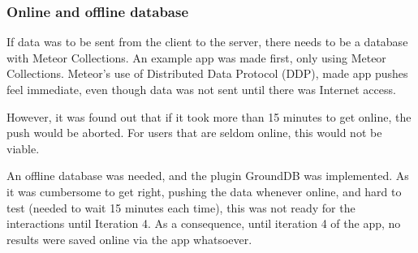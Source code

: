 
\subsubsection{Online and offline database}
If data was to be sent from the client to the server, there needs to be a database with Meteor Collections. An example app was made first, only using Meteor Collections. Meteor's use of Distributed Data Protocol (DDP), made app pushes feel immediate, even though data was not sent until there was Internet access.

However, it was found out that if it took more than 15 minutes to get online, the push would be aborted. For users that are seldom online, this would not be viable.

An offline database was needed, and the plugin GroundDB was implemented. As it was cumbersome to get right, pushing the data whenever online, and hard to test (needed to wait 15 minutes each time), this was not ready for the interactions until Iteration 4. As a consequence, until iteration 4 of the app, no results were saved online via the app whatsoever.

